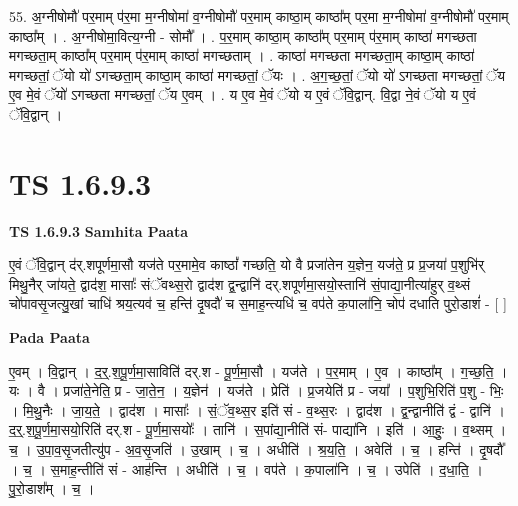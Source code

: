 \documentclass[17pt]{extarticle}
\begin{document}
55. अ॒ग्नीषोमौ॑ पर॒माम् प॑र॒मा म॒ग्नीषोमा॑ व॒ग्नीषोमौ॑ पर॒माम् काष्ठा॒म् काष्ठा᳚म् पर॒मा म॒ग्नीषोमा॑ व॒ग्नीषोमौ॑ पर॒माम् काष्ठा᳚म् । . अ॒ग्नीषोमा॒वित्य॒ग्नी - सोमौ᳚ । . प॒र॒माम् काष्ठा॒म् काष्ठा᳚म् पर॒माम् प॑र॒माम् काष्ठा॑ मगच्छता मगच्छता॒म् काष्ठा᳚म् पर॒माम् प॑र॒माम् काष्ठा॑ मगच्छताम् । . काष्ठा॑ मगच्छता मगच्छता॒म् काष्ठा॒म् काष्ठा॑ मगच्छतां॒ ॅयो यो॑ ऽगच्छता॒म् काष्ठा॒म् काष्ठा॑ मगच्छतां॒ ॅयः । . अ॒ग॒च्छ॒तां॒ ॅयो यो॑ ऽगच्छता मगच्छतां॒ ॅय ए॒व मे॒वं ॅयो॑ ऽगच्छता मगच्छतां॒ ॅय ए॒वम् । . य ए॒व मे॒वं ॅयो य ए॒वं ॅवि॒द्वान्. वि॒द्वा ने॒वं ॅयो य ए॒वं ॅवि॒द्वान् । \newline
\pagebreak
{}
\section*{ TS 1.6.9.3 }

\textbf{TS 1.6.9.3 } \newline
\textbf{Samhita Paata} \newline

ए॒वं ॅवि॒द्वान् द॑र्.शपूर्णमा॒सौ यज॑ते पर॒मामे॒व काष्ठां᳚ गच्छति॒ यो वै प्रजा॑तेन य॒ज्ञेन॒ यज॑ते॒ प्र प्र॒जया॑ प॒शुभि॑र् मिथु॒नैर् जा॑यते॒ द्वाद॑श॒ मासाः᳚ संॅवथ्स॒रो द्वाद॑श द्व॒न्द्वानि॑ दर्.शपूर्णमा॒सयो॒स्तानि॑ सं॒पाद्या॒नीत्या॑हुर् व॒थ्सं चो॑पावसृ॒जत्यु॒खां चाधि॑ श्रय॒त्यव॑ च॒ हन्ति॑ दृ॒षदौ॑ च स॒माह॒न्त्यधि॑ च॒ वप॑ते क॒पाला॑नि॒ चोप॑ दधाति पुरो॒डाशं॑ - [ ] \newline

\textbf{Pada Paata} \newline

ए॒वम् । वि॒द्वान् । द॒र्॒.श॒पू॒र्ण॒मा॒साविति॑ दर्.श - पू॒र्ण॒मा॒सौ । यज॑ते । प॒र॒माम् । ए॒व । काष्ठा᳚म् । ग॒च्छ॒ति॒ । यः । वै । प्रजा॑ते॒नेति॒ प्र - जा॒ते॒न॒ । य॒ज्ञेन॑ । यज॑ते । प्रेति॑ । प्र॒जयेति॑ प्र - जया᳚ । प॒शुभि॒रिति॑ प॒शु - भिः॒ । मि॒थु॒नैः । जा॒य॒ते॒ । द्वाद॑श । मासाः᳚ । सं॒ॅव॒थ्स॒र इति॑ सं - व॒थ्स॒रः । द्वाद॑श । द्व॒न्द्वानीति॑ द्वं - द्वानि॑ । द॒र्॒.श॒पू॒र्ण॒मा॒सयो॒रिति॑ दर्.श - पू॒र्ण॒मा॒सयोः᳚ । तानि॑ । स॒पांद्या॒नीति॑ सं- पाद्या॑नि । इति॑ । आ॒हुः॒ । व॒थ्सम् । च॒ । उ॒पा॒व॒सृ॒जतीत्यु॑प - अ॒व॒सृ॒जति॑ । उ॒खाम् । च॒ । अधीति॑ । श्र॒य॒ति॒ । अवेति॑ । च॒ । हन्ति॑ । दृ॒षदौ᳚ । च॒ । स॒माह॒न्तीति॑ सं - आह॑न्ति । अधीति॑ । च॒ । वप॑ते । क॒पाला॑नि । च॒ । उपेति॑ । द॒धा॒ति॒ । पु॒रो॒डाश᳚म् । च॒ ।  \newline
\end{document}
